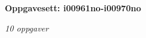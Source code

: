 \centerline{\bf Oppgavesett: i00961no-i00970no}
\vskip 10pt
\centerline{\it 10 oppgaver}\vskip 10pt
\vskip 10pt
